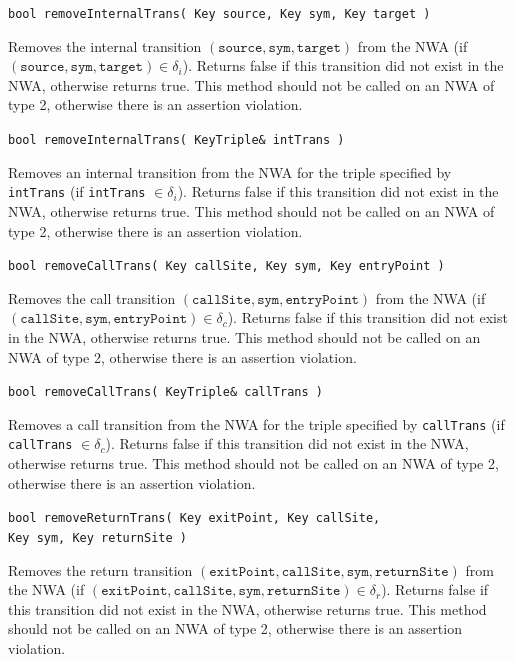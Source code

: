 \documentclass{llncs}
\begin{document}
\begin{description}

  \item\texttt{bool removeInternalTrans( Key source, Key sym, Key target )} \nopagebreak

    Removes the internal transition $(\texttt{source},\texttt{sym},\texttt{target})$ from the NWA (if $(\texttt{source},\texttt{sym},\texttt{target}) \in \delta_i$).  Returns false if this transition did not exist in the NWA, otherwise returns true.  This method should not be called on an NWA of type 2, otherwise there is an assertion violation.

  \item\texttt{bool removeInternalTrans( KeyTriple\& intTrans )} \nopagebreak 

    Removes an internal transition from the NWA for the triple specified by \texttt{intTrans} (if \texttt{intTrans} $\in \delta_i$).  Returns false if this transition did not exist in the NWA, otherwise returns true.  This method should not be called on an NWA of type 2, otherwise there is an assertion violation.

  \item\texttt{bool removeCallTrans( Key callSite, Key sym, Key entryPoint )} \nopagebreak

    Removes the call transition $(\texttt{callSite},\texttt{sym},\texttt{entryPoint})$ from the NWA (if $(\texttt{callSite},\texttt{sym},\texttt{entryPoint}) \in \delta_c$).  Returns false if this transition did not exist in the NWA, otherwise returns true.  This method should not be called on an NWA of type 2, otherwise there is an assertion violation. 
 
  \item\texttt{bool removeCallTrans( KeyTriple\& callTrans )} \nopagebreak

    Removes a call transition from the NWA for the triple specified by \texttt{callTrans} (if \texttt{callTrans} $\in \delta_c$).  Returns false if this transition did not exist in the NWA, otherwise returns true.  This method should not be called on an NWA of type 2, otherwise there is an assertion violation.

  \item\texttt{bool removeReturnTrans( Key exitPoint, Key callSite,\\ \hspace*{3.25cm} Key sym, Key returnSite )} \nopagebreak

    Removes the return transition $(\texttt{exitPoint},\texttt{callSite},\texttt{sym},\texttt{returnSite})$ from the NWA (if $(\texttt{exitPoint},\texttt{callSite},\texttt{sym},\texttt{returnSite}) \in \delta_r$).  Returns false if this transition did not exist in the NWA, otherwise returns true.  This method should not be called on an NWA of type 2, otherwise there is an assertion violation.


\end{description}
\end{document}
